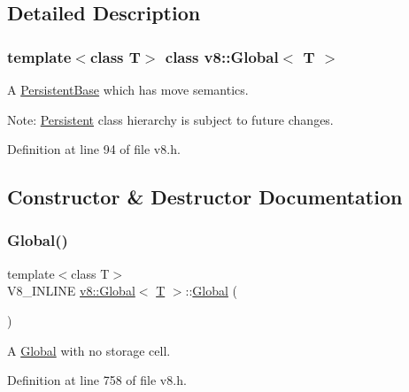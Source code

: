 \subsection{Detailed Description}
\subsubsection*{template$<$class T$>$\newline
class v8\+::\+Global$<$ T $>$}

A \mbox{\hyperlink{classv8_1_1PersistentBase}{Persistent\+Base}} which has move semantics.

Note\+: \mbox{\hyperlink{classv8_1_1Persistent}{Persistent}} class hierarchy is subject to future changes. 

Definition at line 94 of file v8.\+h.



\subsection{Constructor \& Destructor Documentation}
\mbox{\label{classv8_1_1Global_ab1efdf25ff6305e67f3266a6fe90527e}} 
\subsubsection{\texorpdfstring{Global()}{Global()}\hspace{0.1cm}{\footnotesize\ttfamily [1/4]}}
{\footnotesize\ttfamily template$<$class T$>$ \\
V8\+\_\+\+I\+N\+L\+I\+NE \mbox{\hyperlink{classv8_1_1Global}{v8\+::\+Global}}$<$ \mbox{\hyperlink{classv8_1_1internal_1_1torque_1_1T}{T}} $>$\+::\mbox{\hyperlink{classv8_1_1Global}{Global}} (\begin{DoxyParamCaption}{ }\end{DoxyParamCaption})\hspace{0.3cm}{\ttfamily [inline]}}

A \mbox{\hyperlink{classv8_1_1Global}{Global}} with no storage cell. 

Definition at line 758 of file v8.\+h.

\mbox{\label{classv8_1_1Global_a8434bb6729eb4cd0cd85ad81bd8344ad}} 
